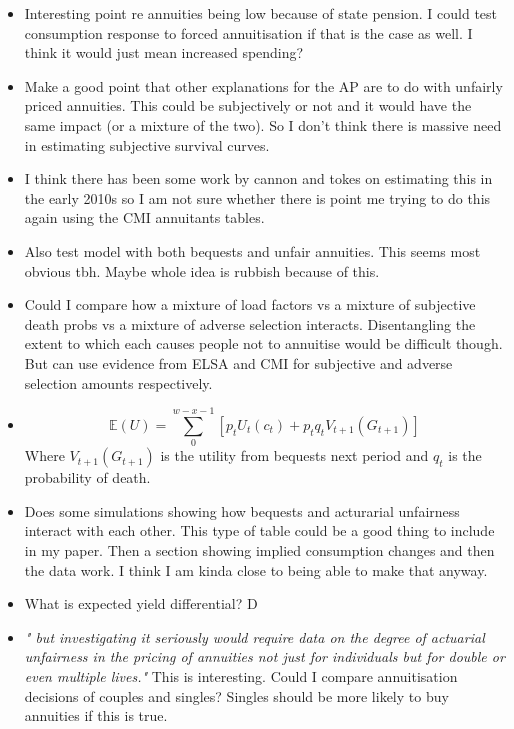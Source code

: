 \documentclass[12pt]{article}
\begin{document}
\begin{itemize}
    \item Interesting point re annuities being low because of state pension.
          I could test consumption response to forced annuitisation if that is the
          case as well. I think it would just mean increased spending?

    \item Make a good point that other explanations for the AP are to do with unfairly priced
          annuities. This could be subjectively or not and it would have the same impact (or
          a mixture of the two). So I don't think there is massive need in estimating subjective
          survival curves.

    \item I think there has been some work by cannon and tokes on estimating this in the
          early 2010s so I am not sure whether there is point me trying to do this again using the
          CMI annuitants tables.

    \item Also test model with both bequests and unfair annuities. This seems most obvious tbh.
          Maybe whole idea is rubbish because of this.

    \item Could I compare how a mixture of load factors vs a mixture of subjective death probs
          vs a mixture of adverse selection interacts. Disentangling the extent to which each causes
          people not to annuitise would be difficult though. But can use evidence from ELSA and CMI for
          subjective and adverse selection amounts respectively.

    \item \begin{equation*}
              \mathbb{E}(U) = \sum_{0}^{w - x - 1}[p_{t}U_{t}(c_{t}) + p_{t}q_{t}V_{t+1}(G_{t+1})]
          \end{equation*}
          Where $V_{t+1}(G_{t+1})$ is the utility from bequests next period and $q_{t}$ is the probability of death.


    \item Does some simulations showing how bequests and acturarial unfairness interact with each other.
          This type of table could be a good thing to include in my paper. Then a section showing implied consumption
          changes and then the data work. I think I am kinda close to being able to make that anyway.

    \item What is expected yield differential? D
    \item \textit{" but investigating it seriously would require data on the
              degree of actuarial unfairness in the pricing of annuities not just for
              individuals but for double or even multiple lives."} This is interesting.
          Could I compare annuitisation decisions of couples and singles? Singles
          should be more likely to buy annuities if this is true.


\end{itemize}
\end{document}
